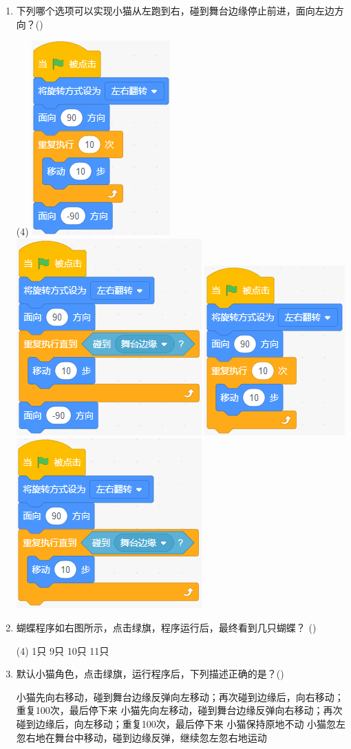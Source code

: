 \documentclass[10pt, a4paper]{article}
\newcommand{\hq}{\hfill(\qquad)}
\begin{document}
\begin{enumerate}
        \item 下列哪个选项可以实现小猫从左跑到右，碰到舞台边缘停止前进，面向左边方向？\hq
        \begin{tasks}(4)
            \task \includegraphics[width=.12\textwidth]{figure/4a.png}
            \task \includegraphics[width=.16\textwidth]{figure/4b.png}
            \task \includegraphics[width=.14\textwidth]{figure/4c.png}
            \task \includegraphics[width=.18\textwidth]{figure/4d.png}
        \end{tasks}

        \item 蝴蝶程序如右图所示，点击绿旗，程序运行后，最终看到几只蝴蝶？ \hq
        \begin{tasks}(4)
            \task 1只
            \task 9只
            \task 10只
            \task 11只
        \end{tasks}

        \item 默认小猫角色，点击绿旗，运行程序后，下列描述正确的是？\hq
        \begin{tasks}
            \task 小猫先向右移动，碰到舞台边缘反弹向左移动；再次碰到边缘后，向右移动；重复100次，最后停下来
            \task 小猫先向左移动，碰到舞台边缘反弹向右移动；再次碰到边缘后，向左移动；重复100次，最后停下来
            \task 小猫保持原地不动
            \task 小猫忽左忽右地在舞台中移动，碰到边缘反弹，继续忽左忽右地运动
        \end{tasks}


\end{enumerate}
\end{document}
